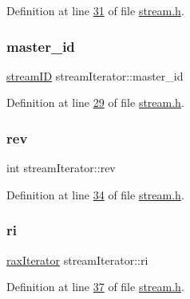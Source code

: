 Definition at line \hyperlink{stream_8h_source_l00031}{31} of file \hyperlink{stream_8h_source}{stream.\+h}.

\mbox{\label{structstreamIterator_a077828904d5170a706d11e359a113b2c}} 
\subsubsection{\texorpdfstring{master\+\_\+id}{master\_id}}
{\footnotesize\ttfamily \hyperlink{structstreamID}{stream\+ID} stream\+Iterator\+::master\+\_\+id}



Definition at line \hyperlink{stream_8h_source_l00029}{29} of file \hyperlink{stream_8h_source}{stream.\+h}.

\mbox{\label{structstreamIterator_a62f95467744a6bd25e61aa0688dd7e70}} 
\subsubsection{\texorpdfstring{rev}{rev}}
{\footnotesize\ttfamily int stream\+Iterator\+::rev}



Definition at line \hyperlink{stream_8h_source_l00034}{34} of file \hyperlink{stream_8h_source}{stream.\+h}.

\mbox{\label{structstreamIterator_ac1891d8b9fb5bed1ceae47ebd6a23b4c}} 
\subsubsection{\texorpdfstring{ri}{ri}}
{\footnotesize\ttfamily \hyperlink{structraxIterator}{rax\+Iterator} stream\+Iterator\+::ri}



Definition at line \hyperlink{stream_8h_source_l00037}{37} of file \hyperlink{stream_8h_source}{stream.\+h}.

\mbox{\label{structstreamIterator_af9e2820f5296601ac2ae494894987879}} 
